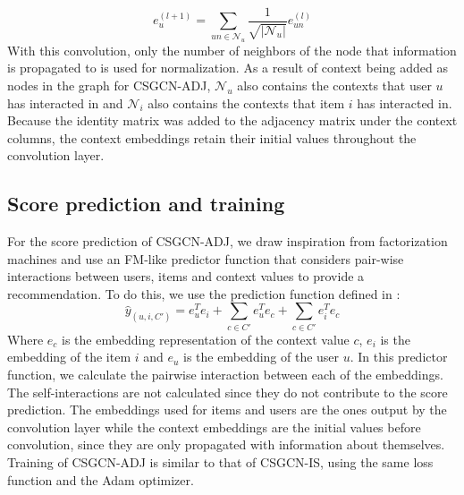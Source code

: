\begin{equation}\label{eq:csgcn_adj_gc_layer_user}
     e_{u}^{(l+1)}=\sum_{un\in \mathcal{N}_{u}}\frac{1}{ \sqrt{|\mathcal{N}_{u}|}}e_{un}^{(l)}
\end{equation}
With this convolution, only the number of neighbors of the node that information is propagated to is used for normalization.
As a result of context being added as nodes in the graph for CSGCN-ADJ, $\mathcal{N}_{u}$ also contains the contexts that user $u$ has interacted in and $\mathcal{N}_{i}$ also contains the contexts that item $i$ has interacted in.
Because the identity matrix was added to the adjacency matrix under the context columns, the context embeddings retain their initial values throughout the convolution layer.

\subsection{Score prediction and training}\label{subsec:csgcn_adj_score_pred}
For the score prediction of CSGCN-ADJ, we draw inspiration from factorization machines and use an FM-like predictor function that considers pair-wise interactions between users, items and context values to provide a recommendation.
To do this, we use the prediction function defined in :
\begin{equation}\label{eq:csgcn_adj_scorepred}
    \hat{y}_{(u,i,C')} = e_u^Te_i + \sum_{c \in C'}e_u^Te_{c} + \sum_{c \in C'}e_i^Te_{c}
\end{equation}
Where $e_{c}$ is the embedding representation of the context value $c$, $e_i$ is the embedding of the item $i$ and $e_u$ is the embedding of the user $u$.
In this predictor function, we calculate the pairwise interaction between each of the embeddings.
The self-interactions are not calculated since they do not contribute to the score prediction.
The embeddings used for items and users are the ones output by the convolution layer while the context embeddings are the initial values before convolution, since they are only propagated with information about themselves.
\\
Training of CSGCN-ADJ is similar to that of CSGCN-IS, using the same loss function and the Adam optimizer.

